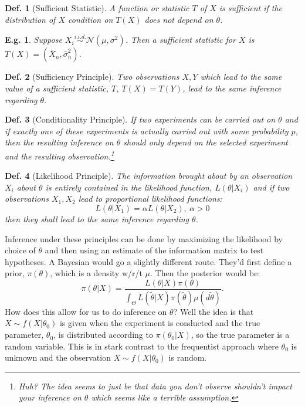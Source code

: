 \documentclass{tufte-book}
\theoremstyle{mytheoremstyle}
\theoremstyle{mylemstyle}
\theoremstyle{mydefstyle}
\newtheorem*{mydef}{Def.}
\newtheorem*{ex}{E.g.}
\begin{document}
\begin{mydef}[Sufficient Statistic] A function or statistic \(T\) of \(X\) is sufficient if the distribution of \(X\) condition on \(T(X)\) does not depend on \(\theta\). \end{mydef}
\begin{ex} Suppose \(X_i \overset{i.i.d.}{\sim} \mathcal{N}(\mu, \sigma^2)\). Then a sufficient statistic for \(X\) is \(T(X) = (\bar{X}_n, \hat{\sigma}_n^2)\). \end{ex}
\begin{mydef}[Sufficiency Principle] Two observations \(X, Y\) which lead to the same value of a sufficient statistic, \(T\), \(T(X) = T(Y)\), lead to the same inference regarding \(\theta\). \end{mydef}
\begin{mydef}[Conditionality Principle] If two experiments can be carried out on \(\theta\) and if exactly one of these experiments is actually carried out with some probability \(p\), then the resulting inference on \(\theta\) should only depend on the selected experiment and the resulting observation.\footnote{Huh? The idea seems to just be that data you don't observe shouldn't impact your inference on \(\theta\) which seems like a terrible assumption.}\end{mydef}
\begin{mydef}[Likelihood Principle] The information brought about by an observation \(X_i\) about \(\theta\) is entirely contained in the likelihood function, \(L(\theta|X_i)\) and if two observations \(X_1, X_2\) lead to proportional likelihood functions:
	\[L(\theta|X_1) = \alpha L(\theta| X_2),\ \alpha > 0\]
then they shall lead to the same inference regarding \(\theta\). \end{mydef}

Inference under these principles can be done by maximizing the likelihood by choice of \(\theta\) and then using an estimate of the information matrix to test hypotheses. A Bayesian would go a slightly different route. They'd first define a prior, \(\pi(\theta)\), which is a density w/r/t \(\mu\). Then the posterior would be:
	\[\pi(\theta|X) = \frac{L(\theta| X)\pi(\theta)}{\int_\Theta L(\tilde{\theta}|X)\pi(\tilde{\theta})\mu(d\tilde{\theta})} \text{.}\]
How does this allow for us to do inference on \(\theta\)? Well the idea is that \(X \sim f(X|\theta_0)\) is given when the experiment is conducted and the true parameter, \(\theta_0\), is distributed according to \(\pi(\theta_0|X)\), so the true parameter is a random variable. This is in stark contrast to the frequentist approach where \(\theta_0\) is unknown and the observation \(X \sim f(X|\theta_0)\) is random. 
\end{document}
